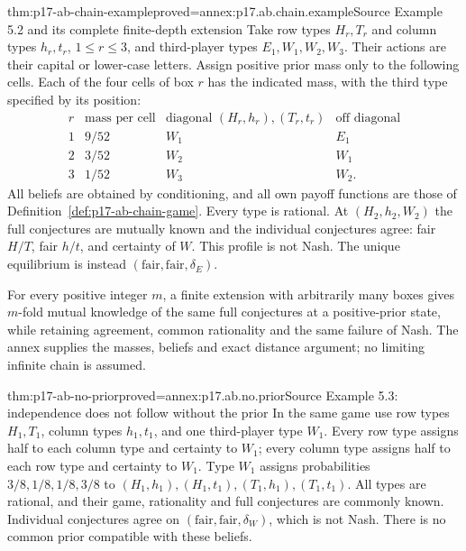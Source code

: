 \begin{hbtheorem}{thm:p17-ab-chain-example}{proved=annex:p17.ab.chain.example}{Source Example 5.2 and its complete finite-depth extension}
Take row types \(H_r,T_r\) and column types \(h_r,t_r\),
\(1\leq r\leq3\), and third-player types \(E_1,W_1,W_2,W_3\).
Their actions are their capital or lower-case letters. Assign
positive prior mass only to the following cells. Each of the four
cells of box \(r\) has the indicated mass, with the third type
specified by its position:
\[
 \begin{array}{c|c|cc}
 r&\text{mass per cell}&\text{diagonal }(H_r,h_r),(T_r,t_r)
                            &\text{off diagonal}\\\hline
 1&9/52&W_1&E_1\\
 2&3/52&W_2&W_1\\
 3&1/52&W_3&W_2 .
 \end{array}
\]
All beliefs are obtained by conditioning, and all own payoff
functions are those of Definition~\ref{def:p17-ab-chain-game}.
Every type is rational. At \((H_2,h_2,W_2)\) the full conjectures
are mutually known and the individual conjectures agree:
fair \(H/T\), fair \(h/t\), and certainty of \(W\). This profile
is not Nash. The unique equilibrium is instead
\((\text{fair},\text{fair},\delta_E)\).

For every positive integer \(m\), a finite extension with
arbitrarily many boxes gives \(m\)-fold mutual knowledge of the
same full conjectures at a positive-prior state, while retaining
agreement, common rationality and the same failure of Nash.
The annex supplies the masses, beliefs and exact distance argument;
no limiting infinite chain is assumed.
\end{hbtheorem}

\begin{hbtheorem}{thm:p17-ab-no-prior}{proved=annex:p17.ab.no.prior}{Source Example 5.3: independence does not follow without the prior}
In the same game use row types \(H_1,T_1\), column types \(h_1,t_1\),
and one third-player type \(W_1\). Every row type assigns half to
each column type and certainty to \(W_1\); every column type assigns
half to each row type and certainty to \(W_1\). Type \(W_1\) assigns
probabilities \(3/8,1/8,1/8,3/8\) to
\((H_1,h_1),(H_1,t_1),(T_1,h_1),(T_1,t_1)\).
All types are rational, and their game, rationality and full
conjectures are commonly known. Individual conjectures agree on
\((\text{fair},\text{fair},\delta_W)\), which is not Nash.
There is no common prior compatible with these beliefs.
\end{hbtheorem}

